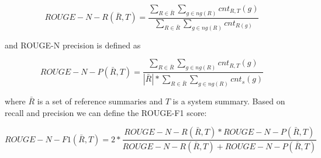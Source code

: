 \documentclass[a4paper,BCOR=10mm]{report}
\numberwithin{lemma}{chapter}
\numberwithin{definition}{chapter}
\begin{document}
\begin{equation}
    \mathit{ROUGE-N-R}(\bar{R}, T) =  \frac{
        \sum_{R \in \bar{R}}
        \sum_{g \in \mathit{ng}(R)}
        \mathit{cnt}_{R,T}(g)
    } {
        \sum_{R \in \bar{R}}
        \sum_{g \in \mathit{ng}(R)}
        \mathit{cnt}_{R(g)}
    }
\end{equation}

and ROUGE-N precision is defined as

\begin{equation}
    \mathit{ROUGE-N-P}(\bar{R}, T) =  \frac{\sum_{R \in \bar{R}} \sum_{g \in \mathit{ng}(R)} \mathit{cnt}_{R,T}(g)}{|\bar{R}| * \sum_{R \in \bar{R}} \sum_{g \in \mathit{ng}(R)} \mathit{cnt}_{s}(g)}
\end{equation}

where $\bar{R}$ is a set of reference summaries and $T$ is a system summary.
Based on recall and precision we can define the ROUGE-F1 score:

\begin{equation}
    \mathit{ROUGE-N-F1}(\bar{R}, T) = 2 * \frac{\mathit{ROUGE-N-R}(\bar{R}, T) * \mathit{ROUGE-N-P}(\bar{R}, T)}{\mathit{ROUGE-N-R}(\bar{R}, T) + \mathit{ROUGE-N-P}(\bar{R}, T)}
\end{equation}
\end{document}
